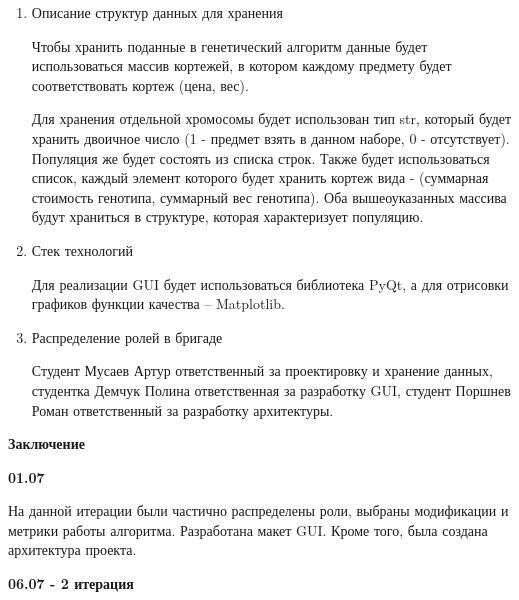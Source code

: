 \documentclass{article}
\begin{document}
\begin{enumerate}
\item Описание структур данных для хранения

Чтобы хранить поданные в генетический алгоритм данные будет использоваться массив кортежей, в котором каждому предмету будет соответствовать кортеж (цена, вес).

Для хранения отдельной хромосомы будет использован тип str, который будет хранить двоичное число (1 - предмет взять в данном наборе, 0 - отсутствует). Популяция же будет состоять из списка строк. Также будет использоваться список, каждый элемент которого будет хранить кортеж вида - (суммарная стоимость генотипа, суммарный вес генотипа). Оба вышеоуказанных массива будут храниться в структуре, которая характеризует популяцию. 

\item Стек технологий

Для реализации GUI будет использоваться библиотека PyQt, а для отрисовки графиков функции качества -- Matplotlib.

\item Распределение ролей в бригаде

Студент Мусаев Артур ответственный за проектировку и хранение данных, студентка Демчук Полина ответственная за разработку GUI, студент Поршнев Роман ответственный за разработку архитектуры.

\end{enumerate}

\newpage

\textbf{Заключение}

\textbf{01.07}

На данной итерации были частично распределены роли, выбраны модификации и метрики работы алгоритма. Разработана макет GUI. Кроме того, была создана архитектура проекта.

\textbf{06.07 - 2 итерация}
\end{document}
